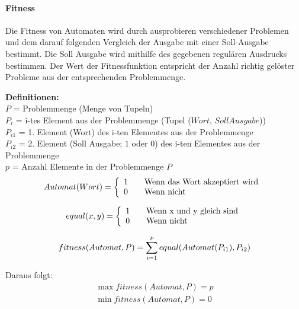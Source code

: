 \paragraph{Fitness}
Die Fitness von Automaten wird durch ausprobieren verschiedener Problemen und dem darauf folgenden Vergleich der Ausgabe mit einer Soll-Ausgabe bestimmt. Die Soll Ausgabe wird mithilfe des gegebenen regulären Ausdrucks bestimmen. Der Wert der Fitnessfunktion entspricht der Anzahl richtig gelöster Probleme aus der entsprechenden Problemmenge.

\textbf{Definitionen:}\\
$P$ = Problemmenge (Menge von Tupeln)\\
$P_i$ = i-tes Element aus der Problemmenge (Tupel ($Wort$, $Soll Ausgabe$))\\
$P_{i1}$ = 1. Element (Wort) des i-ten Elementes aus der Problemmenge\\
$P_{i2}$ = 2. Element (Soll Ausgabe; $1$ oder $0$) des i-ten Elementes aus der Problemmenge\\
$p$ = Anzahl Elemente in der Problemmenge $P$\\

\begin{equation}
Automat(Wort) = \left\{ 
 \begin{array}{l l}
   1 & \quad \text{Wenn das Wort akzeptiert wird}\\
   0 & \quad \text{Wenn nicht}
 \end{array} \right.\\
\end{equation}

\begin{equation}
equal(x, y) = \left\{ 
 \begin{array}{l l}
   1 & \quad \text{Wenn x und y gleich sind}\\
   0 & \quad \text{Wenn nicht}
 \end{array} \right.
\end{equation}

\begin{equation}
fitness(Automat, P) = \sum_{i=1}^{p} equal(Automat(P_{i1}), P_{i2})\\
\end{equation}

Daraus folgt:\\
\begin{equation}
   \begin{split}
	\max fitness(Automat, P) = p\\
	\min fitness(Automat, P) = 0
   \end{split}
\end{equation}

